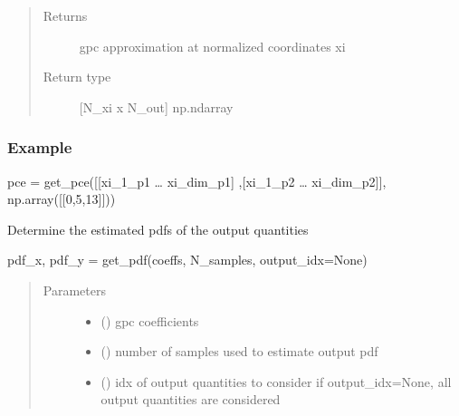 \documentclass[letterpaper,10pt,english,openany,oneside]{sphinxmanual}
\begin{document}
\begin{fulllineitems}
\begin{fulllineitems}
\begin{quote}
\begin{description}
\begin{itemize}
\end{itemize}

\item[{Returns}] \leavevmode
{} \textendash{} gpc approximation at normalized coordinates xi

\item[{Return type}] \leavevmode
{[}N\_xi x N\_out{]} np.ndarray

\end{description}\end{quote}
\subsubsection*{Example}

pce = get\_pce({[}{[}xi\_1\_p1 … xi\_dim\_p1{]} ,{[}xi\_1\_p2 … xi\_dim\_p2{]}{]}, np.array({[}{[}0,5,13{]}{]}))

\end{fulllineitems}


\begin{fulllineitems}
\label{\detokenize{pygpc:pygpc.gpc.gPC.get_pdf}}
Determine the estimated pdfs of the output quantities

pdf\_x, pdf\_y = get\_pdf(coeffs, N\_samples, output\_idx=None)
\begin{quote}\begin{description}
\item[{Parameters}] \leavevmode\begin{itemize}
\item {} 
 (\sphinxstyleliteralemphasis{\sphinxupquote{{[}}}\sphinxstyleliteralemphasis{\sphinxupquote{{]} }}) \textendash{} gpc coefficients

\item {} 
 () \textendash{} number of samples used to estimate output pdf

\item {} 
 (\sphinxstyleliteralemphasis{\sphinxupquote{{[}}}\sphinxstyleliteralemphasis{\sphinxupquote{{]} }}\sphinxstyleliteralemphasis{\sphinxupquote{, }}\sphinxstyleliteralemphasis{\sphinxupquote{, }}) \textendash{} idx of output quantities to consider
if output\_idx=None, all output quantities are considered


\end{itemize}
\end{description}
\end{quote}
\end{fulllineitems}
\end{fulllineitems}
\end{document}
